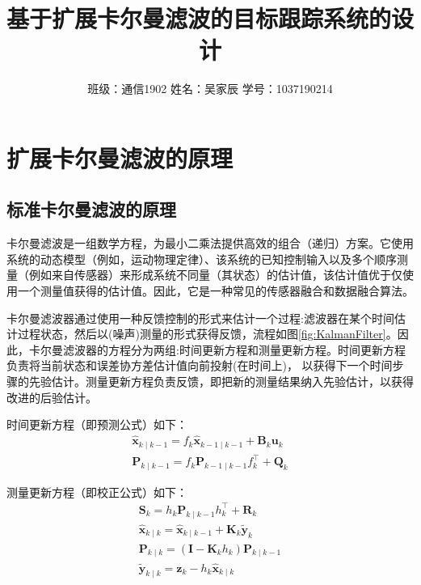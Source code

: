 \documentclass{article}
\title{基于扩展卡尔曼滤波的目标跟踪系统的设计}
\author{班级：通信1902\qquad
姓名：吴家辰\qquad
学号：1037190214}
\date{}
\begin{document}
%
\small \maketitle

\section{扩展卡尔曼滤波的原理}

\subsection{标准卡尔曼滤波的原理}
卡尔曼滤波\cite{r1}是一组数学方程，为最小二乘法提供高效的组合（递归）方案。它使用系统的动态模型（例如，运动物理定律）、该系统的已知控制输入以及多个顺序测量（例如来自传感器）来形成系统不同量（其状态）的估计值，该估计值优于仅使用一个测量值获得的估计值。因此，它是一种常见的传感器融合和数据融合算法。

卡尔曼滤波器通过使用一种反馈控制的形式来估计一个过程:滤波器在某个时间估计过程状态，然后以(噪声)测量的形式获得反馈，流程如图\ref{fig:KalmanFilter}。因此，卡尔曼滤波器的方程分为两组:时间更新方程和测量更新方程。时间更新方程负责将当前状态和误差协方差估计值向前投射(在时间上)， 以获得下一个时间步骤的先验估计。测量更新方程负责反馈，即把新的测量结果纳入先验估计，以获得改进的后验估计。\cite{welch1995introduction}

时间更新方程（即预测公式）如下：
\begin{equation*}
\begin{array}{l}
\hat{\mathbf{x}}_{k \mid k-1}=f_{k} \hat{\mathbf{x}}_{k-1 \mid k-1}+\mathbf{B}_{k} \mathbf{u}_{k} \\
\mathbf{P}_{k \mid k-1}=f_{k} \mathbf{P}_{k-1 \mid k-1} f_{k}^{\top}+\mathbf{Q}_{k}
\end{array}
\end{equation*}

测量更新方程（即校正公式）如下：
\begin{equation*}
\begin{array}{l}
\mathbf{S}_{k}=h_{k} \mathbf{P}_{k \mid k-1} h_{k}^{\top}+\mathbf{R}_{k} \\
\hat{\mathbf{x}}_{k \mid k}=\hat{\mathbf{x}}_{k \mid k-1}+\mathbf{K}_{k} \tilde{\mathbf{y}}_{k} \\
\mathbf{P}_{k \mid k}=\left(\mathbf{\mathbf{I}}-\mathbf{K}_{k} h_{k}\right) \mathbf{P}_{k \mid k-1} \\
\tilde{\mathbf{y}}_{k \mid k}=\mathbf{z}_{k}-h_{k} \hat{\mathbf{x}}_{k \mid k}
\end{array}
\end{equation*}
\end{document}
